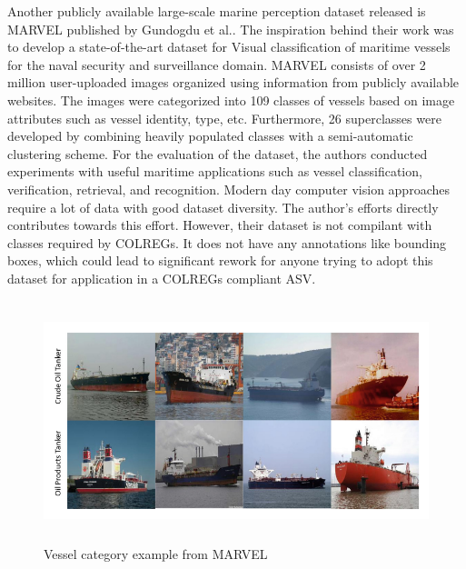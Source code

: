 Another publicly available large-scale marine perception dataset released is MARVEL published by Gundogdu et al.\cite{gundogdu2017marvel}. The inspiration behind their work was to develop a state-of-the-art dataset for Visual classification of maritime vessels for the naval security and surveillance domain. MARVEL consists of over 2 million user-uploaded images organized using information from publicly available websites. The images were categorized into 109 classes of vessels based on image attributes such as vessel identity, type, etc. Furthermore, 26 superclasses were developed by combining heavily populated classes with a semi-automatic clustering scheme. For the evaluation of the dataset, the authors conducted experiments with useful maritime applications such as vessel classification, verification, retrieval, and recognition\cite{gundogdu2017marvel}. Modern day computer vision approaches require a lot of data with good dataset diversity. The author's efforts directly contributes towards this effort. However, their dataset is not compilant with classes required by COLREGs. It does not have any annotations like bounding boxes, which could lead to significant rework for anyone trying to adopt this dataset for application in a COLREGs compliant ASV. 
\begin{figure}[H]
    \centering
    \includegraphics[width=\textwidth,height=7cm,keepaspectratio=true]{src/Images/marvel_sample.PNG}
    \caption{
     Vessel category example from MARVEL\cite{gundogdu2017marvel}
     }
\end{figure}
\\

